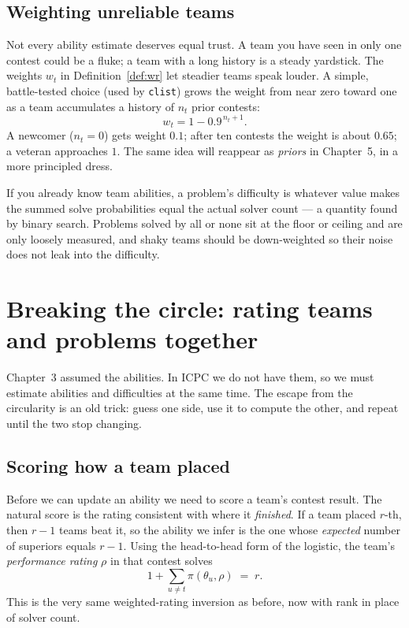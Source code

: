 \documentclass[11pt]{report}
\theoremstyle{definition}
\numberwithin{equation}{chapter}
\begin{document}
\section{Weighting unreliable teams}\label{sec:weight}

Not every ability estimate deserves equal trust. A team you have seen in only one
contest could be a fluke; a team with a long history is a steady yardstick. The
weights $w_t$ in Definition~\ref{def:wr} let steadier teams speak louder. A simple,
battle-tested choice (used by \texttt{clist}) grows the weight from near zero
toward one as a team accumulates a history of $n_t$ prior contests:
\begin{equation}\label{eq:weight}
  w_t = 1 - 0.9^{\,n_t+1}.
\end{equation}
A newcomer ($n_t=0$) gets weight $0.1$; after ten contests the weight is about
$0.65$; a veteran approaches $1$. The same idea will reappear as \emph{priors} in
Chapter~5, in a more principled dress.

\begin{takeaway}
If you already know team abilities, a problem's difficulty is whatever value
makes the summed solve probabilities equal the actual solver count --- a quantity
found by binary search. Problems solved by all or none sit at the floor or
ceiling and are only loosely measured, and shaky teams should be down-weighted so
their noise does not leak into the difficulty.
\end{takeaway}

\chapter{Breaking the circle: rating teams and problems together}

Chapter~3 assumed the abilities. In ICPC we do not have them, so we must estimate
abilities and difficulties at the same time. The escape from the circularity is
an old trick: guess one side, use it to compute the other, and repeat until the
two stop changing.

\section{Scoring how a team placed}

Before we can update an ability we need to score a team's contest result. The
natural score is the rating consistent with where it \emph{finished}. If a team
placed $r$-th, then $r-1$ teams beat it, so the ability we infer is the one whose
\emph{expected} number of superiors equals $r-1$. Using the head-to-head form of
the logistic, the team's \emph{performance rating} $\rho$ in that contest solves
\begin{equation}\label{eq:perf}
  1+\sum_{u\neq t}\pi(\theta_u,\rho)\;=\;r .
\end{equation}
This is the very same weighted-rating inversion as before, now with rank in place
of solver count.
\end{document}
